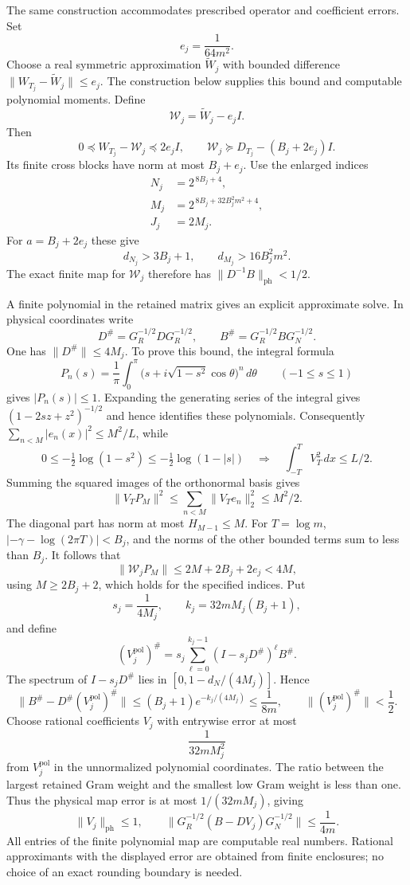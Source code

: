 The same construction accommodates prescribed operator and
coefficient errors. Set
\[
 e_j=\frac1{64m^2}.
\]
Choose a real symmetric approximation $\widetilde W_j$ with
bounded difference $\|W_{T_j}-\widetilde W_j\|\le e_j$.
The construction below supplies this bound and computable polynomial
moments.  Define
\[
 \mathcal W_j=\widetilde W_j-e_jI.
\]
Then
\[
 0\preceq W_{T_j}-\mathcal W_j\preceq2e_jI,\qquad
 \mathcal W_j\succeq D_{T_j}-(B_j+2e_j)I.
\]
Its finite cross blocks have norm at most $B_j+e_j$.
Use the enlarged indices
\begin{align}
 N_j&=2^{\,8B_j+4},\\
 M_j&=2^{\,8B_j+32B_j^2m^2+4},\\
 J_j&=2M_j.
 \label{eq:cofinal-robust-indices}
\end{align}
For $a=B_j+2e_j$ these give
\[
 d_{N_j}>3B_j+1,\qquad
 d_{M_j}>16B_j^2m^2.
\]
The exact finite map for $\mathcal W_j$ therefore has
$\|D^{-1}B\|_{\mathrm{ph}}<1/2$.

A finite polynomial in the retained matrix gives an explicit
approximate solve. In physical coordinates write
\[
 D^\#=G_R^{-1/2}DG_R^{-1/2},\qquad
 B^\#=G_R^{-1/2}BG_N^{-1/2}.
\]
One has $\|D^\#\|\le4M_j$.  To prove this bound, the integral
formula
\[
 P_n(s)=\frac1\pi\int_0^\pi
       \bigl(s+i\sqrt{1-s^2}\cos\theta\bigr)^n\,d\theta
       \qquad(-1\le s\le1)
\]
gives $|P_n(s)|\le1$.  Expanding the generating series of the
integral gives $(1-2sz+z^2)^{-1/2}$ and hence identifies these
polynomials.  Consequently
$\sum_{n<M}|e_n(x)|^2\le M^2/L$, while
\[
 0\le-\tfrac12\log(1-s^2)
 \le-\tfrac12\log(1-|s|)
 \quad\Longrightarrow\quad
 \int_{-T}^TV_T^2\,dx\le L/2.
\]
Summing the squared images of the orthonormal basis gives
\[
 \|V_TP_M\|^2\le\sum_{n<M}\|V_Te_n\|_2^2
       \le M^2/2.
\]
The diagonal part has norm at most $H_{M-1}\le M$.
For $T=\log m$, $|-\gamma-\log(2\pi T)|<B_j$, and
the norms of the other bounded terms sum to less than $B_j$.
It follows that
\[
 \|\mathcal W_jP_M\|
 \le2M+2B_j+2e_j<4M,
\]
using $M\ge2B_j+2$, which holds for the specified indices.
Put
\[
 s_j=\frac1{4M_j},\qquad
 k_j=32mM_j(B_j+1),
\]
and define
\[
 (V_j^{\mathrm{pol}})^\#
 =s_j\sum_{\ell=0}^{k_j-1}(I-s_jD^\#)^\ell B^\#.
\]
The spectrum of $I-s_jD^\#$ lies in
$[0,1-d_N/(4M_j)]$. Hence
\[
 \|B^\#-D^\#(V_j^{\mathrm{pol}})^\#\|
 \le(B_j+1)e^{-k_j/(4M_j)}
 \le\frac1{8m},
 \qquad
 \|(V_j^{\mathrm{pol}})^\#\|<\frac12.
\]
Choose rational coefficients $V_j$ with entrywise error at most
\[
 \frac1{32mM_j^2}
\]
from $V_j^{\mathrm{pol}}$ in the unnormalized polynomial coordinates.
The ratio between the largest retained Gram weight and the
smallest low Gram weight is less than one. Thus the physical
map error is at most $1/(32mM_j)$, giving
\begin{equation}\label{eq:cofinal-finite-forcing}
 \|V_j\|_{\mathrm{ph}}\le1,\qquad
 \|G_R^{-1/2}(B-DV_j)G_N^{-1/2}\|
 \le\frac1{4m}.
\end{equation}
All entries of the finite polynomial map are computable real
numbers. Rational approximants with the displayed error are
obtained from finite enclosures; no choice of an exact rounding
boundary is needed.


